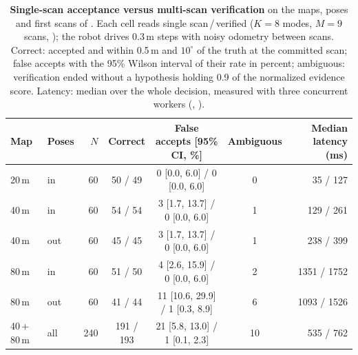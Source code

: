 \begin{table}[t]
\centering
\caption{\textbf{Single-scan acceptance versus multi-scan verification} on the maps, poses and first scans of . Each cell reads single scan\,/\,verified ($K=8$ modes, $M=9$ scans, ); the robot drives 0.3\,m steps with noisy odometry between scans. Correct: accepted and within 0.5\,m and $10^\circ$ of the truth at the committed scan; false accepts with the 95\% Wilson interval of their rate in percent; ambiguous: verification ended without a hypothesis holding 0.9 of the normalized evidence score. Latency: median over the whole decision, measured with three concurrent workers (, ).}\label{tab:bbs_verify}
\small
\begin{tabular}{@{}llrcccr@{}}
\toprule
Map & Poses & $N$ & Correct & False accepts [95\% CI, \%] & Ambiguous & Median latency (ms) \\
\midrule
20\,m & in & 60 & 50 / 49 & 0 [0.0, 6.0] / 0 [0.0, 6.0] & 0 & 35 / 127 \\
40\,m & in & 60 & 54 / 54 & 3 [1.7, 13.7] / 0 [0.0, 6.0] & 1 & 129 / 261 \\
40\,m & out & 60 & 45 / 45 & 3 [1.7, 13.7] / 0 [0.0, 6.0] & 1 & 238 / 399 \\
80\,m & in & 60 & 51 / 50 & 4 [2.6, 15.9] / 0 [0.0, 6.0] & 2 & 1351 / 1752 \\
80\,m & out & 60 & 41 / 44 & 11 [10.6, 29.9] / 1 [0.3, 8.9] & 6 & 1093 / 1526 \\
\midrule
40\,+\,80\,m & all & 240 & 191 / 193 & 21 [5.8, 13.0] / 1 [0.1, 2.3] & 10 & 535 / 762 \\
\bottomrule
\end{tabular}
\end{table}
